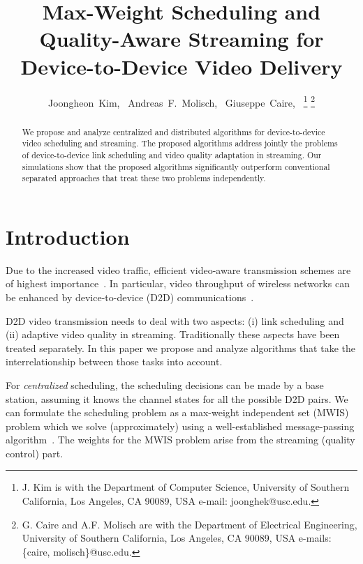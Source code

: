 \documentclass[journal]{IEEEtran}
\begin{document}
\title{Max-Weight Scheduling and Quality-Aware Streaming for Device-to-Device Video Delivery}

\author{Joongheon~Kim,~%
	Andreas~F.~Molisch,~%
	Giuseppe~Caire,~%
\thanks{J. Kim is with the Department of Computer Science, University of Southern California, Los Angeles, CA 90089, USA e-mail: joonghek@usc.edu.}%
\thanks{G. Caire and A.F. Molisch are with the Department of Electrical Engineering, University of Southern California, Los Angeles, CA 90089, USA e-mails: \{caire, molisch\}@usc.edu.}%
}
\maketitle

\begin{abstract}
We propose and analyze centralized and distributed algorithms for device-to-device video scheduling and streaming.
The proposed algorithms address jointly
the problems of device-to-device link scheduling and
video quality adaptation in streaming.
Our simulations show that the proposed algorithms significantly outperform conventional separated approaches that treat these two problems independently.
\end{abstract}

\section{Introduction}
Due to the increased video traffic, efficient video-aware transmission schemes are of highest importance~\cite{cm2013golrezaei}.
In particular, video throughput of wireless networks can be enhanced by device-to-device (D2D) communications~\cite{jsac2014ji}.

D2D video transmission needs to deal with two aspects: (i) link scheduling and (ii) adaptive video quality in streaming. Traditionally these aspects have been treated separately. In this paper we propose and analyze algorithms that take the interrelationship between those tasks into account.


For \textit{centralized} scheduling, the scheduling decisions can be made by a base station, assuming it knows the channel states for all the possible D2D pairs.
We can formulate the scheduling problem as a max-weight independent set (MWIS) problem which we solve (approximately) using a well-established message-passing algorithm~\cite{tit2009sanghavi}.
The weights for the MWIS problem arise from the streaming (quality control) part.
\end{document}
